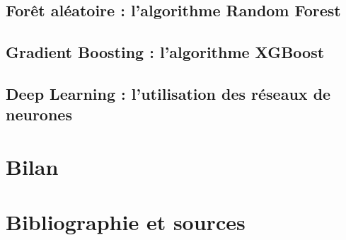 \documentclass[14pt, openany]{article}
\begin{document}
\subsection{Forêt aléatoire : l'algorithme Random Forest}

\subsection{Gradient Boosting : l'algorithme XGBoost}

\subsection{Deep Learning : l'utilisation des réseaux de neurones}

\section{Bilan}

\section{Bibliographie et sources}
\end{document}
